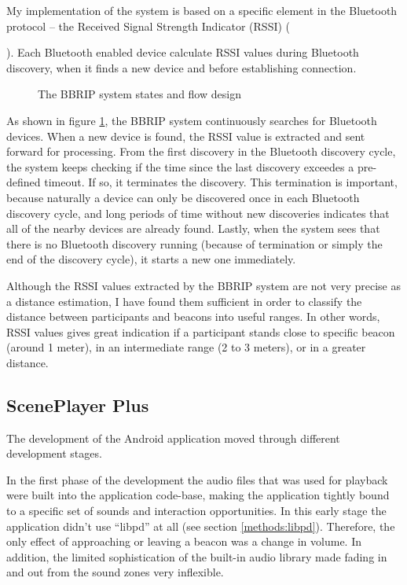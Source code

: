 \documentclass[a4paper,11pt]{article}
\begin{document}
My implementation of the system is based on a specific element in the Bluetooth protocol -- the Received Signal Strength Indicator (RSSI) ({\cite{bray12}).
Each Bluetooth enabled device calculate RSSI values during Bluetooth discovery, when it finds a new device and before establishing connection.

\begin{figure}[!htb]
	\centering
	\def\svgwidth{\columnwidth}
  	
	\caption{The BBRIP system states and flow design}\label{fig:bbrip}
\end{figure}

As shown in figure \ref{fig:bbrip}, the BBRIP system continuously searches for Bluetooth devices.
When a new device is found, the RSSI value is extracted and sent forward for processing.
From the first discovery in the Bluetooth discovery cycle, the system keeps checking if the time since the last discovery exceedes a pre-defined timeout.
If so, it terminates the discovery.
This termination is important, because naturally a device can only be discovered once in each Bluetooth discovery cycle, and long periods of time without new discoveries indicates that all of the nearby devices are already found.
Lastly, when the system sees that there is no Bluetooth discovery running (because of termination or simply the end of the discovery cycle), it starts a new one immediately.

Although the RSSI values extracted by the BBRIP system are not very precise as a distance estimation, I have found them sufficient in order to classify the distance between participants and beacons into useful ranges.
In other words, RSSI values gives great indication if a participant stands close to specific beacon (around 1 meter), in an intermediate range (2 to 3 meters), or in a greater distance.

\subsection{ScenePlayer Plus}\label{sceneplayer_plus}

The development of the Android application moved through different development stages.

In the first phase of the development the audio files that was used for playback were built into the application code-base, making the application tightly bound to a specific set of sounds and interaction opportunities.
In this early stage the application didn't use ``libpd'' at all (see section \ref{methods:libpd}).
Therefore, the only effect of approaching or leaving a beacon was a change in volume.
In addition, the limited sophistication of the built-in audio library made fading in and out from the sound zones very inflexible.

}
\end{document}
